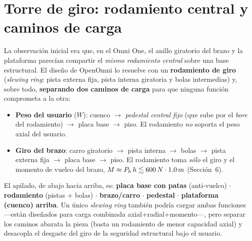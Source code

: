 \documentclass[10pt,twocolumn]{article}
\providecommand{\SI}[2]{#1\,#2}
\providecommand{\meter}{m}\providecommand{\milli}{m}\providecommand{\kilo}{k}
\begin{document}
\section{Torre de giro: rodamiento central y caminos de carga}
La observaci\'on inicial era que, en el Omni One, el anillo giratorio del brazo y la plataforma
parec\'ian compartir el \emph{mismo rodamiento central} sobre una base estructural. El dise\~no
de OpenOmni lo resuelve con un \textbf{rodamiento de giro} (\emph{slewing ring}: pista externa
fija, pista interna giratoria y bolas intermedias) y, sobre todo, \textbf{separando dos caminos
de carga} para que ninguna funci\'on comprometa a la otra:
\begin{itemize}\itemsep2pt
\item \textbf{Peso del usuario} ($W$): cuenco $\rightarrow$ \emph{pedestal central fijo} (que sube
por el \emph{bore} del rodamiento) $\rightarrow$ placa base $\rightarrow$ piso. El rodamiento
\emph{no} soporta el peso axial del usuario.
\item \textbf{Giro del brazo}: carro giratorio $\rightarrow$ pista interna $\rightarrow$ bolas
$\rightarrow$ pista externa fija $\rightarrow$ placa base $\rightarrow$ piso. El rodamiento
toma \emph{s\'olo} el giro y el momento de vuelco del brazo,
$M \approx P_h\,h \lesssim \SI{600}{\newton}\cdot\SI{1.0}{\meter}$ (Secci\'on~6).
\end{itemize}
El apilado, de abajo hacia arriba, es: \textbf{placa base con patas} (anti-vuelco) $\cdot$
\textbf{rodamiento} (pistas + bolas) $\cdot$ \textbf{brazo/carro} $\cdot$ \textbf{pedestal} $\cdot$
\textbf{plataforma (cuenco) arriba}. Un \'unico \emph{slewing ring} tambi\'en podr\'ia cargar
ambas funciones ---est\'an dise\~nados para carga combinada axial+radial+momento---, pero
separar los caminos abarata la pieza (basta un rodamiento de menor capacidad axial) y desacopla
el desgaste del giro de la seguridad estructural bajo el usuario.
\vspace{2pt}

\noindent{}
\vspace{4pt}
\end{document}
